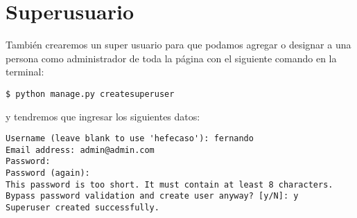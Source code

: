 \documentclass[12pt,letterpaper]{article}
\begin{document}
\section{Superusuario}

También crearemos un super usuario para que podamos agregar o designar a una persona como administrador de toda la página con el siguiente comando en la terminal:\\

\begin{verbatim}
$ python manage.py createsuperuser
\end{verbatim}

y tendremos que ingresar los siguientes datos:\\

\begin{verbatim}
Username (leave blank to use 'hefecaso'): fernando
Email address: admin@admin.com
Password: 
Password (again): 
This password is too short. It must contain at least 8 characters.
Bypass password validation and create user anyway? [y/N]: y
Superuser created successfully.
\end{verbatim}
\end{document}

